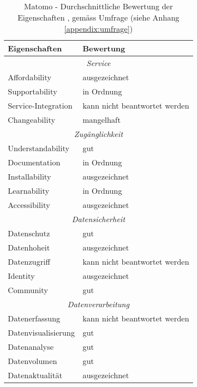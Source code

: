 \begin{table}[h]
	\centering
	\begin{tabular}{ | p{4cm} | p{10cm} |}
		\hline
    \textbf{Eigenschaften} & \textbf{Bewertung}  \\
    \hline 
    \multicolumn{2}{|c|}{\textit{Service}}\\ \hline 
    Affordability  &  ausgezeichnet \\ \hline
    Supportability & in Ordnung \\ \hline
    Service-Integration & kann nicht beantwortet werden \\ \hline
    Changeability  & mangelhaft \\ \hline
    \multicolumn{2}{|c|}{\textit{Zugänglichkeit}}\\ \hline 
    Understandability   & gut \\ \hline
    Documentation  & in Ordnung \\ \hline
    Installability & ausgezeichnet \\ \hline
    Learnability  & in Ordnung \\ \hline
    Accessibility  & ausgezeichnet \\ \hline
    \multicolumn{2}{|c|}{\textit{Datensicherheit}}\\ \hline 
    Datenschutz  & gut \\ \hline
    Datenhoheit & ausgezeichnet \\ \hline
    Datenzugriff  & kann nicht beantwortet werden \\ \hline
    Identity  & ausgezeichnet \\  \hline
    Community  & gut \\ \hline
    \multicolumn{2}{|c|}{\textit{Datenverarbeitung}}\\ \hline 
    Datenerfassung  & kann nicht beantwortet werden \\  \hline
    Datenvisualisierung & gut \\ \hline
    Datenanalyse & gut \\ \hline
    Datenvolumen & gut \\ \hline
    Datenaktualität  & ausgezeichnet \\ \hline
	\end{tabular}
	\caption{Matomo - Durchschnittliche Bewertung der Eigenschaften \parencite{softwareProcurementEvaluationTable}, \parencite[S. 178]{nakatani2011toolselectionmethod} gemäss Umfrage (siehe Anhang \ref{appendix:umfrage})}
	\label{tab: matomofeaturebewertung}
\end{table}

